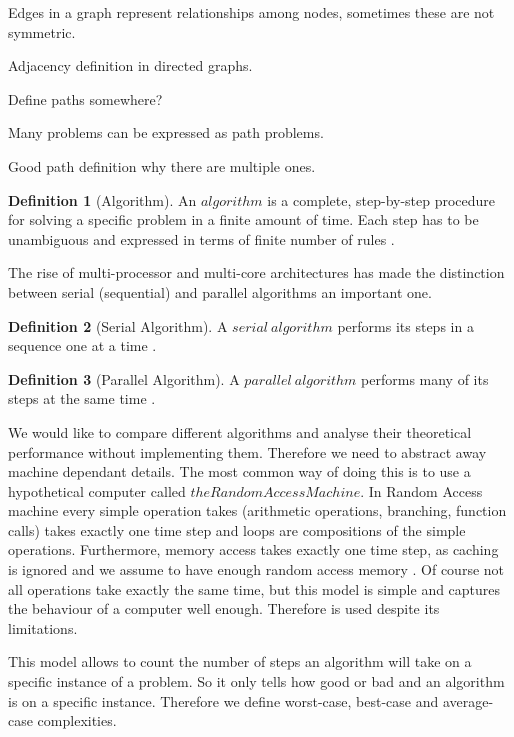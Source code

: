 \documentclass{report}
\theoremstyle{plain}
\theoremstyle{definition}
\newtheorem{definition}{Definition}
\theoremstyle{remark}
\numberwithin{definition}{chapter}
\numberwithin{example}{chapter}
\numberwithin{figure}{chapter}
\begin{document}
Edges in a graph represent relationships among nodes, sometimes these are not symmetric.

Adjacency definition in directed graphs.

Define paths somewhere?

Many problems can be expressed as path problems.

Good path definition why there are multiple ones.

\begin{definition}[Algorithm]
An $algorithm$ is a complete, step-by-step procedure for solving a specific problem in a finite amount of time. Each step has to be unambiguous and expressed in terms of finite number of rules \cite{berman1996fundamentals}.
\end{definition}

The rise of multi-processor and multi-core architectures has made the distinction between serial (sequential) and parallel algorithms an important one.

\begin{definition}[Serial Algorithm]
A $serial \ algorithm$ performs its steps in a sequence one at a time \cite{berman1996fundamentals}.
\end{definition}

\begin{definition}[Parallel Algorithm]
A $parallel \ algorithm$ performs many of its steps at the same time \cite{berman1996fundamentals}.
\end{definition}

We would like to compare different algorithms and analyse their theoretical performance without implementing them. Therefore we need to abstract away machine dependant details. The most common way of doing this is to use a hypothetical computer called $the Random Access Machine$. In Random Access machine every simple operation takes (arithmetic operations, branching, function calls) takes exactly one time step and loops are compositions of the simple operations. Furthermore, memory access takes exactly one time step, as caching is ignored and we assume to have enough random access memory \cite{skiena504algorithm}. Of course not all operations take exactly the same time, but this model is simple and captures the behaviour of a computer well enough. Therefore is used despite its limitations.

This model allows to count the number of steps an algorithm will take on a specific instance of a problem. So it only tells how good or bad and an algorithm is on a specific instance. Therefore we define worst-case, best-case and average-case complexities.
\end{document}
